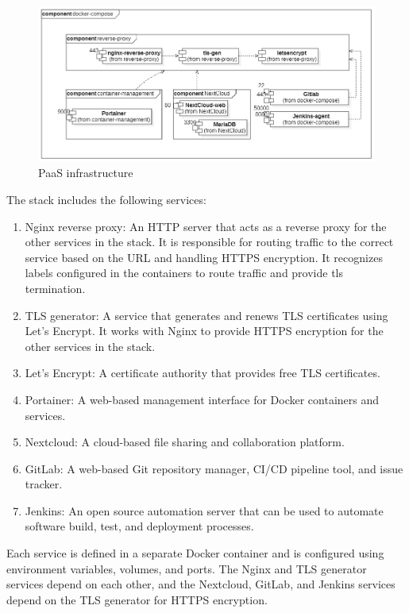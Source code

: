  \begin{figure}[H] 
\includegraphics[width=1.0\textwidth,angle=00]{assets/f9.jpg}
\caption{PaaS infrastructure}
\label{fig:f9}
\end{figure}

The stack includes the following services: 
\begin{enumerate}
\item Nginx reverse proxy: An HTTP server that acts as a reverse proxy for the other services in the stack. It is responsible for routing traffic to the correct service based on the URL and handling HTTPS encryption. It recognizes labels configured in the containers to route traffic and provide tls termination. 
\item TLS generator: A service that generates and renews TLS certificates using Let's Encrypt. It works with Nginx to provide HTTPS encryption for the other services in the stack. 
\item Let's Encrypt: A certificate authority that provides free TLS certificates. 
\item Portainer: A web-based management interface for Docker containers and services. 
\item Nextcloud: A cloud-based file sharing and collaboration platform. 
\item GitLab: A web-based Git repository manager, CI/CD pipeline tool, and issue tracker. 
\item Jenkins: An open source automation server that can be used to automate software build, test, and deployment processes. 
\end{enumerate}

Each service is defined in a separate Docker container and is configured using environment variables, volumes, and ports. The Nginx and TLS generator services depend on each other, and the Nextcloud, GitLab, and Jenkins services depend on the TLS generator for HTTPS encryption. 


